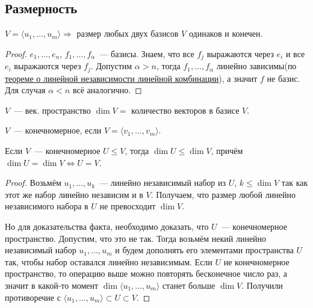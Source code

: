\subsection{Размерность}
\begin{theorem}
    $V = \langle u_1,\dots,u_m\rangle \Rightarrow$ размер любых двух базисов $V$ одинаков и конечен.
\end{theorem}
\begin{proof}
    $e_1,\dots,e_n$, $f_1,\dots,f_\alpha$~--- базисы. Знаем, что все $f_j$
    выражаются через $e_i$ и все $e_i$ выражаются через $f_j$.
    Допустим $\alpha > n$, тогда $f_1,\dots,f_\alpha$ линейно зависимы(по \hyperref[thm:О линейной независимости линейной комбинации]
    {теореме о линейной независимости линейной комбинации}), а значит $f$ не базис.
    Для случая $\alpha < n$ всё аналогично.
\end{proof}
\begin{definition}
    $V$~--- век. пространство $\dim V =$ количество векторов в базисе $V$.
\end{definition}
\begin{definition}
    $V$~--- конечномерное, если $V = \langle v_1,\dots, v_m\rangle$.
\end{definition}
\begin{lemma}
    Если $V$~--- конечномерное $U \leq V$, тогда $\dim U \leq \dim V$, причём $\dim U = \dim V \Leftrightarrow U=V$.
\end{lemma}
\begin{proof}
    Возьмём $u_1,\dots,u_k$~--- линейно независимый набор из $U$, $k\leq \dim V$ так как этот же набор линейно независим и в $V$. 
    Получаем, что размер любой линейно независимого набора в $U$ не превосходит $\dim V$.

    Но для доказательства факта, необходимо доказать, что $U$~--- конечномерное пространство. Допустим, что это не так.
    Тогда возьмём некий линейно независимый набор $u_1,\dots, u_m$ и будем дополнять его элементами пространства $U$ так, чтобы набор оставался линейно независимым.
    Если $U$ не конечномерное пространство, то операцию выше можно повторять бесконечное число раз,
    а значит в какой-то момент $\dim\langle u_1, \dots, u_m\rangle$ станет больше $\dim V$. 
    Получили противоречие с $\langle u_1, \dots, u_m\rangle \subset U \subset V$.
\end{proof}
